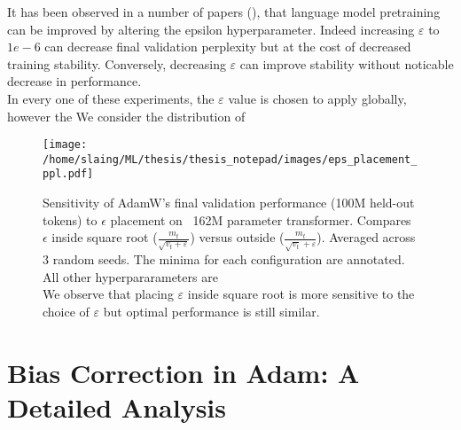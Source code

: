 \documentclass[12pt]{book}
\begin{document}
It has been observed in a number of papers (\cite{yuan2020eadamoptimizerepsilonimpact}), that language model pretraining can be improved by altering the epsilon hyperparameter. Indeed increasing $\varepsilon $ to $1e-6$ can decrease final validation perplexity but at the cost of decreased training stability. Conversely, decreasing  $\varepsilon $ can improve stability without noticable decrease in performance. \\
In every one of these experiments, the $\varepsilon $ value is chosen to apply globally, however the 
We consider the distribution of 
\begin{figure}[t]
    \centering
\texttt{[image: /home/slaing/ML/thesis/thesis\_notepad/images/eps\_placement\_ppl.pdf]}  %
    \caption{
        Sensitivity of AdamW's final validation performance (100M held-out tokens) to $\epsilon$ placement
        on ~162M parameter transformer. Compares $\epsilon$ inside square root ($\frac{m_t}{\sqrt{v_t+\varepsilon }  }$)
        versus outside ($\frac{m_t}{\sqrt{v_t} + \varepsilon }$). Averaged across 3 random seeds. 
        The minima for each configuration are annotated. All other hyperpararameters are 
	\\
	We observe that placing $\varepsilon $ inside square root is more sensitive to the choice of $\varepsilon $ but optimal performance is still similar.  
    }
    \label{fig:adamw_epsilon}
\end{figure}



\chapter{Bias Correction in Adam: A Detailed Analysis}
\label{chap: bias correction}
\end{document}
